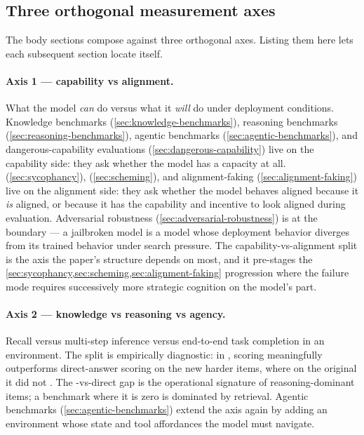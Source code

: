 \subsection{Three orthogonal measurement axes}
\label{sec:measuring-axes}

The body sections compose against three orthogonal axes. Listing them
here lets each subsequent section locate itself.

\paragraph{Axis 1 --- capability vs alignment.} What the model
\emph{can} do versus what it \emph{will} do under deployment
conditions. Knowledge benchmarks (\cref{sec:knowledge-benchmarks}),
reasoning benchmarks (\cref{sec:reasoning-benchmarks}), agentic
benchmarks (\cref{sec:agentic-benchmarks}), and dangerous-capability
evaluations (\cref{sec:dangerous-capability}) live on the capability
side: they ask whether the model has a capacity at all. 
(\cref{sec:sycophancy}), 
(\cref{sec:scheming}), and alignment-faking
(\cref{sec:alignment-faking}) live on the alignment side: they ask
whether the model behaves aligned because it \emph{is} aligned, or
because it has the capability and incentive to look aligned during
evaluation. Adversarial robustness (\cref{sec:adversarial-robustness})
is at the boundary --- a jailbroken model is a model whose
deployment behavior diverges from its trained behavior under search
pressure. The capability-vs-alignment split is the
axis the paper's structure depends on most, and it pre-stages the
\cref{sec:sycophancy,sec:scheming,sec:alignment-faking} progression
where the failure mode requires successively more strategic
cognition on the model's part.

\paragraph{Axis 2 --- knowledge vs reasoning vs agency.} Recall
versus multi-step inference versus end-to-end task completion in an
environment. The split is empirically diagnostic: in ,
 scoring meaningfully outperforms direct-answer
scoring on the new harder items, where on the original  it did
not \citep[\S{}sec-cot]{wang2024-mmlu-pro}. The -vs-direct gap
is the operational signature of reasoning-dominant items; a benchmark
where it is zero is dominated by retrieval. Agentic benchmarks
(\cref{sec:agentic-benchmarks}) extend the axis again by adding an
environment whose state and tool affordances the model must navigate.

